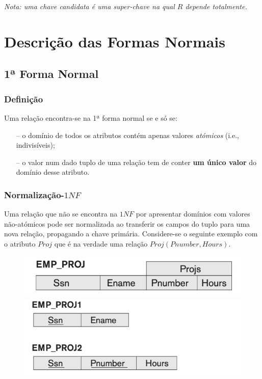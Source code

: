 \documentclass[oneside]{book}
\theoremstyle{definition}
\begin{document}
\textit{Nota: uma chave candidata é uma super-chave na qual $R$ depende totalmente.}

\section{Descrição das Formas Normais}

\subsection{1ª Forma Normal}

\subsubsection*{Definição}

Uma relação encontra-se na 1ª forma normal se e só se:
\begin{itemize}
    \itemsep0cm
    \item[--] o domínio de todos os atributos contém apenas valores \textit{atómicos} (i.e., indivisíveis);
    \item[--] o valor num dado tuplo de uma relação tem de conter \textbf{um único valor} do domínio desse atributo. 
\end{itemize}

\subsubsection*{Normalização-$1NF$}

Uma relação que não se encontra na $1NF$ por apresentar domínios com valores não-atómicos pode ser normalizada ao transferir os campos do tuplo para uma nova relação, propagando a chave primária. Considere-se o seguinte exemplo com o atributo $Proj$ que é na verdade uma relação $Proj(Pnumber, Hours)$.

\begin{figure}[h]
    \centering
    \includegraphics[scale = 0.6]{cap_norm/1nf_1.png}
    \hspace*{1em}
    \includegraphics[scale = 0.6]{cap_norm/1nf_2.png}
\end{figure}
\end{document}
